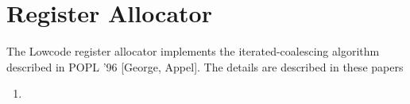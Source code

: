 \section{Register Allocator}

The Lowcode register allocator implements the iterated-coalescing algorithm
described in POPL '96 [George, Appel].  The details are described in these
papers
\begin{enumerate}
\item {}
\end{enumerate}
